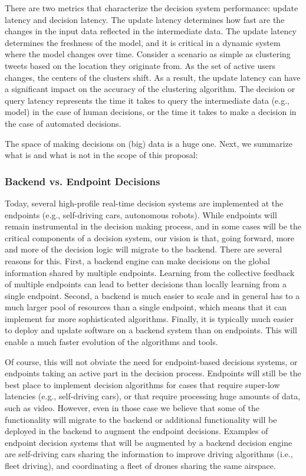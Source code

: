 There are two metrics that characterize the decision system performance: update latency and decision latency. The update latency determines how fast are the changes in the input data reflected in the intermediate data. The update latency determines the freshness of the model, and it is critical in a dynamic system where the model changes over time. Consider a scenario as simple as clustering tweets based on the location they originate from. As the set of active users changes, the centers of the clusters shift. As a result, the update latency can have a significant impact on the accuracy of the clustering algorithm. The decision or query latency represents the time it takes to query the intermediate data (e.g., model) in the case of human decisions, or the time it takes to make a decision in the case of automated decisions.


The space of making decisions on (big) data is a huge one. Next, we summarize what is and what is not in the scope of this proposal:

\subsubsection{Backend vs. Endpoint Decisions}

Today, several high-profile real-time decision systems are implemented at the endpoints (e.g., self-driving cars, autonomous robots). While endpoints will remain instrumental in the decision making process, and in some cases will be the critical components of a decision system, our vision is that, going forward, more and more of the decision logic will migrate to the backend. There are several reasons for this. First, a backend engine can make decisions on the global information shared by multiple endpoints. Learning from the collective feedback of multiple endpoints can lead to better decisions than locally learning from a single endpoint. Second, a backend is much easier to scale and in general has to a much larger pool of resources than a single endpoint, which means that it can implement far more sophisticated algorithms. Finally, it is typically much easier to deploy and update software on a backend system than on endpoints. This will enable a much faster evolution of the algorithms and tools.

Of course, this will not obviate the need for endpoint-based decisions systems, or endpoints taking an active part in the decision process. Endpoints will still be the best place to implement decision algorithms for cases that require super-low latencies (e.g., self-driving cars), or that require processing huge amounts of data, such as video. However, even in those case we believe that some of the functionality will migrate to the backend or additional functionality will be deployed in the backend to augment the endpoint decisions. Examples of endpoint decision systems that will be augmented by a backend decision engine are self-driving cars sharing the information to improve driving algorithms (i.e., fleet driving), and coordinating a fleet of drones sharing the same airspace.  

